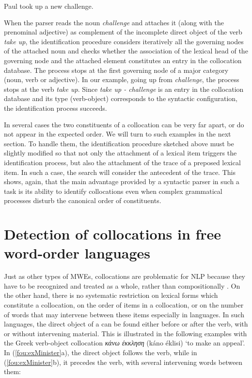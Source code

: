 \documentclass[output=paper]{langsci/langscibook}
\begin{document}
\begin{exe}
  \ex\label{fou:exFirst}
  Paul took up a new challenge.\\
  {\small {} }
\end{exe}

When the parser reads the noun \textit{challenge} and attaches it (along with the prenominal adjective) as complement of the incomplete   direct object of the verb \textit{take up}, the identification procedure considers iteratively all the governing nodes of the attached noun and checks whether the association of the lexical head of the governing node and the attached element constitutes an entry in the collocation database. The process stops at the first governing node of a major category (noun, verb or adjective). In our example, going up from \textit{challenge}, the process stops at the verb \textit{take up}. Since \textit{take up - challenge} is an entry in the collocation database and its type (verb-object) corresponds to the syntactic configuration, the identification process succeeds.

In several cases the two constituents of a collocation can be very far apart, or do not appear in the expected order. We will turn to such examples in the next section. To handle them, the identification procedure sketched above must be slightly modified so that not only the attachment of a lexical item triggers the identification process, but also the attachment of the trace of a preposed lexical item. In such a case, the search will consider the antecedent of the trace. 
This shows, again, that the main advantage provided by a syntactic parser in such a task is its ability to identify collocations even when complex grammatical processes disturb the canonical order of constituents.


\section{Detection of collocations in free word-order languages}
\label{fou:sec4}
Just as other types of MWEs, collocations are problematic for NLP because they have to be recognized and treated as a whole, rather than compositionally \citep{sag02}. On the other hand, there is no systematic restriction on lexical forms which constitute a collocation, on the order of items in a collocation, or on the number of words that may intervene between these items especially in  languages. In such languages, the direct object of a  can be found either before or after the verb, with or without intervening material. This is illustrated in the following examples with the Greek verb-object collocation {\em κάνω έκκληση} (káno éklisi)
`to make an appeal'. 
In (\ref{fou:exMinister}a), %
the direct object 
follows the verb, while in (\ref{fou:exMinister}b), %
it precedes the verb, with several intervening words between them:
\end{document}
